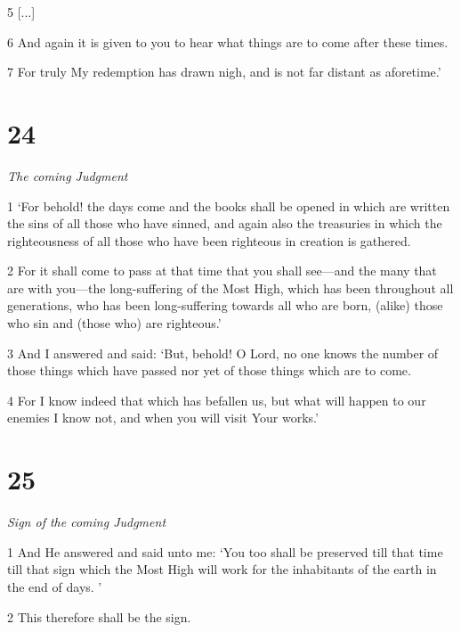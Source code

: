 \par 5 [...]

\par 6 And again it is given to you to hear what things are to come after these times. 

\par 7 For truly My redemption has drawn nigh, and is not far distant as aforetime.’

\chapter{24}

\par \textit{The coming Judgment}

\par 1 ‘For behold! the days come and the books shall be opened in which are written the sins of all those who have sinned, and again also the treasuries in which the righteousness of all those who have been righteous in creation is gathered. 

\par 2 For it shall come to pass at that time that you shall see—and the many that are with you—the long-suffering of the Most High, which has been throughout all generations, who has been long-suffering towards all who are born, (alike) those who sin and (those who) are righteous.’

\par 3 And I answered and said: ‘But, behold! O Lord, no one knows the number of those things which have passed nor yet of those things which are to come. 

\par 4 For I know indeed that which has befallen us, but what will happen to our enemies I know not, and when you will visit Your works.’

\chapter{25}

\par \textit{Sign of the coming Judgment}

\par 1 And He answered and said unto me: ‘You too shall be preserved till that time till that sign which the Most High will work for the inhabitants of the earth in the end of days. ’

\par 2 This therefore shall be the sign. 

